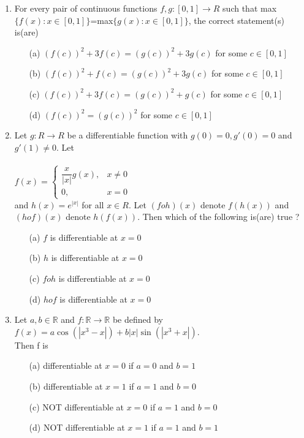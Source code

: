 \documentclass[journal,12pt,twocolumn]{IEEEtran}
\begin{document}
\begin{enumerate}
\item For every pair of continuous functions $f,g:[0,1] \to R$ such that max$\{f(x):x \in [0,1]\}$=max$\{g(x):x \in [0,1]\}$, the correct statement(s) is(are)
\begin{itemize}
\item[(a)] $(f(c))^2+3f(c)=(g(c))^2+3g(c)$ for some $c \in [0,1]$\\
\item[(b)] $(f(c))^2+f(c)=(g(c))^2+3g(c)$ for some $c \in [0,1]$\\
\item[(c)] $(f(c))^2+3f(c)=(g(c))^2+g(c)$ for some $c \in [0,1]$\\
\item[(d)] $(f(c))^2=(g(c))^2$ for some $c \in [0,1]$\\
\end{itemize}

\item Let $g:R \to R$ be a differentiable function with $g(0)=0, g'(0)=0$ and $g'(1)\neq 0$. Let \\ \\$f(x)=\begin{cases}
\dfrac{x}{|x|}g(x), & \text{$x\neq 0$}\\
0, & \text{$x=0$}
\end{cases}$ \\ and $h(x)=e^{|x|}$ for all $x \in R$. Let $(foh)(x)$ denote $f(h(x))$ and $(hof)(x)$ denote $h(f(x))$. Then which of the following is(are) true ?
\begin{itemize}
\item[(a)] $f$ is differentiable at $x=0$
\item[(b)] $h$ is differentiable at $x=0$
\item[(c)] $foh$ is differentiable at $x=0$
\item[(d)] $hof$ is differentiable at $x=0$
\end{itemize}

\item Let $a, b\in\mathbb{R}$ and $f:\mathbb{R}\to\mathbb{R}$ be defined by \\ $f(x)=a\cos (|x^3-x|)+b|x|\sin(|x^3+x|)$.\\ Then f is
\begin{itemize}
\item[(a)] differentiable at $x=0$ if $a=0$ and $b=1$
\item[(b)] differentiable at $x=1$ if $a=1$ and $b=0$
\item[(c)] NOT differentiable at $x=0$ if $a=1$ and $b=0$
\item[(d)] NOT differentiable at $x=1$ if $a=1$ and $b=1$\\
\end{itemize}


\end{enumerate}
\end{document}
